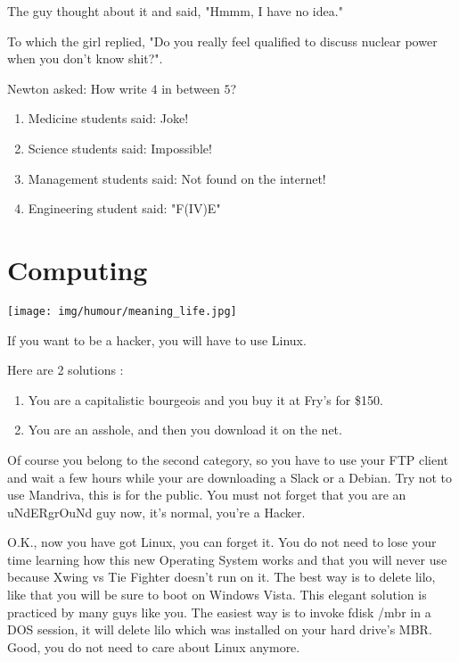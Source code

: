 The guy thought about it and said, "Hmmm, I have no idea."

To which the girl replied, "Do you really feel qualified to discuss nuclear power when you don't know shit?".

\begin{center}\underline{\hspace{5 cm}}\end{center}

Newton asked: How write $4$ in between $5$?

\begin{enumerate}
	\item Medicine students said: Joke!
	
	\item Science students said: Impossible!
	
	\item Management students said: Not found on the internet!
	
	\item Engineering student said: "F(IV)E"
\end{enumerate}

	\pagebreak
	\section{Computing}

	\begin{center}
	\texttt{[image: img/humour/meaning\_life.jpg]}
	\end{center}
\begin{center}\underline{\hspace{5 cm}}\end{center}	

If you want to be a hacker, you will have to use Linux.

Here are 2 solutions :
\begin{enumerate}
	\item You are a capitalistic bourgeois and you buy it at Fry's for \$150.
	\item You are an asshole, and then you download it on the net.
\end{enumerate}

Of course you belong to the second category, so you have to use your FTP client and wait a few hours while your are downloading a Slack or a Debian. Try not to use Mandriva, this is for the public. You must not forget that you are an uNdERgrOuNd guy now, it's normal, you're a Hacker.

O.K., now you have got Linux, you can forget it. You do not need to lose your time learning how this new Operating System works and that you will never use because Xwing vs Tie Fighter doesn't run on it. The best way is to delete lilo, like that you will be sure to boot on Windows Vista. This elegant solution is practiced by many guys like you. The easiest way is to invoke fdisk /mbr in a DOS session, it will delete lilo which was installed on your hard drive's MBR. Good, you do not need to care about Linux anymore.

